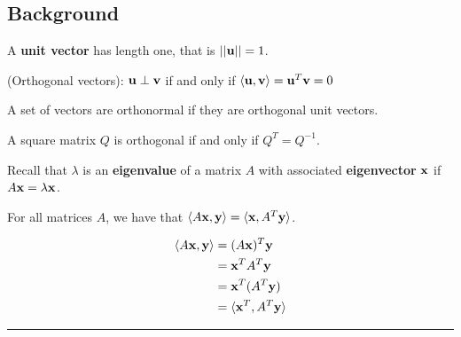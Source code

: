 \begin{questions}
	
	
\subsection*{Background}	
	
	
	



\question A {\textbf{unit vector}} has length one, that is $|| {\bf u} || = 1$.  

 

\question   (Orthogonal vectors):  ${\bf u} \perp {\bf v}$ if and only if $\langle {\bf u}, {\bf v} \rangle =  {\bf u}^T {\bf v} = 0$

 
\question  A set of vectors are orthonormal if they are orthogonal unit vectors.   


\question A square matrix $Q$ is orthogonal if and only if $Q^T = Q^{-1}$.  




	
	
	
 \question Recall that $\lambda$ is an \textbf{eigenvalue} of a matrix $A$ with associated \textbf{eigenvector} $\bf{x}$ if $A{\bf x} = \lambda {\bf x}$.  

 
 
 
 
 
 
 
 
	
	\question For all matrices $A$, we have that  $\langle A{\bf x}, {\bf y} \rangle = \langle {\bf x}, A^T{\bf y} \rangle$.
	
	\proof  \begin{align*} 
	\langle A{\bf x}, {\bf y} \rangle &= (A{\bf x})^T {\bf y}\\
	&= {\bf x}^T A^T {\bf y} \\
	&= {\bf x}^T (A^T {\bf y}) \\
	&= \langle {\bf x}^T,  A^T {\bf y} \rangle 
	\end{align*}

\rule[0.001in]{\textwidth}{0.00025in}
























\end{questions}
